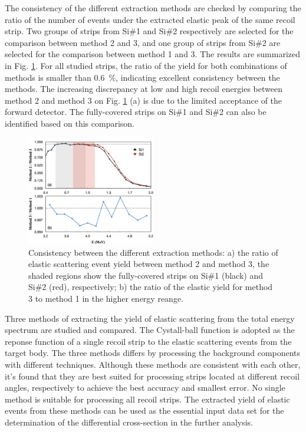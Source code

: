 \documentclass[fleqn,twocolumn,a4paper]{ikpar}
\begin{document}
The consistency of the different extraction methods are checked by comparing the
ratio of the number of events under the extracted elastic peak of the same recoil strip.
Two groups of strips from Si\#1 and Si\#2 respectively are selected for the
comparison between method 2 and 3, and one group of strips from Si\#2 are selected
for the comparison between method 1 and 3.
The results are summarized in Fig. \ref{fig:extraction_consistence}.
For all studied strips, the ratio of the yield for both combinations of methods
is smaller than \SI{0.6}{\percent}, indicating excellent consistency between the methods.
The increasing discrepancy at low and high recoil energies between method 2 and
method 3 on Fig. \ref{fig:extraction_consistence} (a) is due to the limited
acceptance of the forward detector.
The fully-covered strips on Si\#1 and Si\#2 can also be identified based on this comparison.
\begin{figure}[!htb]
	\includegraphics[width=0.5\textwidth]{./comparison_methods.png}
  \caption{Consistency between the different extraction
    methods: a) the ratio of elastic scattering event yield between method 2 and
    method 3, the shaded regions show the fully-covered strips on Si\#1
    (black) and Si\#2 (red), respectively; b) the ratio of the elastic yield for
    method 3 to method 1 in the higher energy reange.}
  \label{fig:extraction_consistence}
\end{figure}

\par
\medskip

Three methods of extracting the yield of elastic scattering from the total
energy spectrum are studied and compared.
The Cystall-ball function is adopted as the reponse function of a single recoil strip to the
elastic scattering events from the target body.
The three methods differs by processing the background components with different techniques.
Although these methods are consistent with each other, it's found that they are best suited for
processing strips located at different recoil angles, respectively to achieve the best accuracy
and smallest error.
No single method is suitable for processing all recoil strips.
The extracted yield of elastic events from these methods can be used as
the essential input data set for the determination of the differential cross-section in the further analysis.
\end{document}
